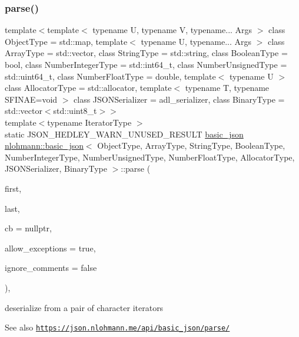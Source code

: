 \subsubsection{\texorpdfstring{parse()}{parse()}\hspace{0.1cm}{\footnotesize\ttfamily [2/2]}}
{\footnotesize\ttfamily template$<$template$<$ typename U, typename V, typename... Args $>$ class Object\+Type = std\+::map, template$<$ typename U, typename... Args $>$ class Array\+Type = std\+::vector, class String\+Type  = std\+::string, class Boolean\+Type  = bool, class Number\+Integer\+Type  = std\+::int64\+\_\+t, class Number\+Unsigned\+Type  = std\+::uint64\+\_\+t, class Number\+Float\+Type  = double, template$<$ typename U $>$ class Allocator\+Type = std\+::allocator, template$<$ typename T, typename S\+F\+I\+N\+A\+E=void $>$ class J\+S\+O\+N\+Serializer = adl\+\_\+serializer, class Binary\+Type  = std\+::vector$<$std\+::uint8\+\_\+t$>$$>$ \\
template$<$typename Iterator\+Type $>$ \\
static J\+S\+O\+N\+\_\+\+H\+E\+D\+L\+E\+Y\+\_\+\+W\+A\+R\+N\+\_\+\+U\+N\+U\+S\+E\+D\+\_\+\+R\+E\+S\+U\+LT \hyperlink{classnlohmann_1_1basic__json}{basic\+\_\+json} \hyperlink{classnlohmann_1_1basic__json}{nlohmann\+::basic\+\_\+json}$<$ Object\+Type, Array\+Type, String\+Type, Boolean\+Type, Number\+Integer\+Type, Number\+Unsigned\+Type, Number\+Float\+Type, Allocator\+Type, J\+S\+O\+N\+Serializer, Binary\+Type $>$\+::parse (\begin{DoxyParamCaption}\item[{Iterator\+Type}]{first,  }\item[{Iterator\+Type}]{last,  }\item[{const \hyperlink{classnlohmann_1_1basic__json_a0273d074462644e5d5a7ff313ad0d742}{parser\+\_\+callback\+\_\+t}}]{cb = {\ttfamily nullptr},  }\item[{const bool}]{allow\+\_\+exceptions = {\ttfamily true},  }\item[{const bool}]{ignore\+\_\+comments = {\ttfamily false} }\end{DoxyParamCaption})\hspace{0.3cm}{\ttfamily [inline]}, {\ttfamily [static]}}



deserialize from a pair of character iterators 

\begin{DoxySeeAlso}{See also}
\href{https://json.nlohmann.me/api/basic_json/parse/}{\tt https\+://json.\+nlohmann.\+me/api/basic\+\_\+json/parse/} 
\end{DoxySeeAlso}
\mbox{\label{classnlohmann_1_1basic__json_adcc786998f220a5b3083ee8a37c4553e}} 
